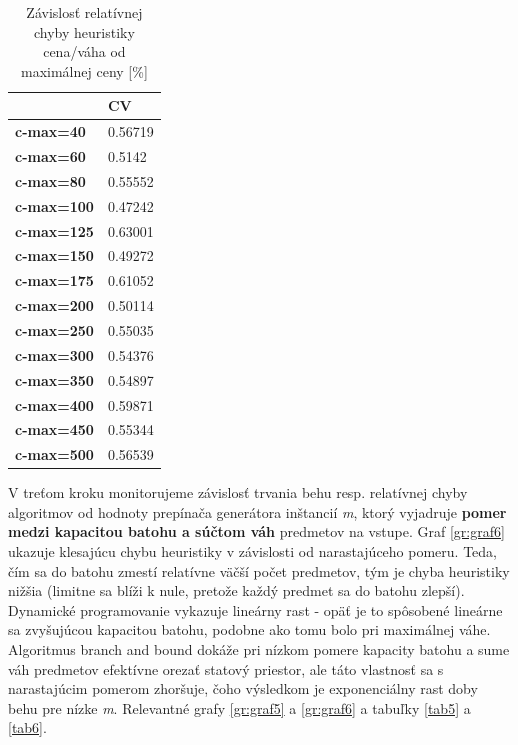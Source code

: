 \documentclass[slovak]{article}
\begin{document}
\begin{table}[htb!]\centering
	\begin{tabularx}{\textwidth}{ | X | X | }
	  \hline                       
							& \textbf{CV} 	\\ \hline
		\textbf{c-max=40}	&	0.56719
			\\ \hline
		\textbf{c-max=60}	&	0.5142
			\\ \hline
		\textbf{c-max=80}	&	0.55552
			\\ \hline
		\textbf{c-max=100}	&	0.47242
			\\ \hline
		\textbf{c-max=125}	&	0.63001
			\\ \hline
		\textbf{c-max=150}	&	0.49272
			\\ \hline
		\textbf{c-max=175}	&	0.61052
			\\ \hline
		\textbf{c-max=200}	&	0.50114
			\\ \hline
		\textbf{c-max=250}	&	0.55035
			\\ \hline
		\textbf{c-max=300}	&	0.54376
			\\ \hline
		\textbf{c-max=350}	&	0.54897
			\\ \hline
		\textbf{c-max=400}	&	0.59871
			\\ \hline
		\textbf{c-max=450}	&	0.55344
			\\ \hline								
		\textbf{c-max=500}	&	0.56539
			\\ \hline								
	\end{tabularx}
\caption{Závislosť relatívnej chyby heuristiky cena/váha od maximálnej ceny [\%]}
\label{tab4}
\end{table}

V treťom kroku monitorujeme závislosť trvania behu resp. relatívnej chyby algoritmov od hodnoty prepínača generátora inštancií \emph{m}, ktorý vyjadruje \textbf{pomer medzi kapacitou batohu a súčtom váh} predmetov na vstupe. Graf \ref{gr:graf6} ukazuje klesajúcu chybu heuristiky v závislosti od narastajúceho pomeru. Teda, čím sa do batohu zmestí relatívne väčší počet predmetov, tým je chyba heuristiky nižšia (limitne sa blíži k nule, pretože každý predmet sa do batohu zlepší). Dynamické programovanie vykazuje lineárny rast - opäť je to spôsobené lineárne sa zvyšujúcou kapacitou batohu, podobne ako tomu bolo pri maximálnej váhe. Algoritmus branch and bound dokáže pri nízkom pomere kapacity batohu a sume váh predmetov efektívne orezať statový priestor, ale táto vlastnosť sa s narastajúcim pomerom zhoršuje, čoho výsledkom je exponenciálny rast doby behu pre nízke \emph{m}. Relevantné grafy \ref{gr:graf5} a \ref{gr:graf6} a tabuľky \ref{tab5} a \ref{tab6}.
\end{document}
